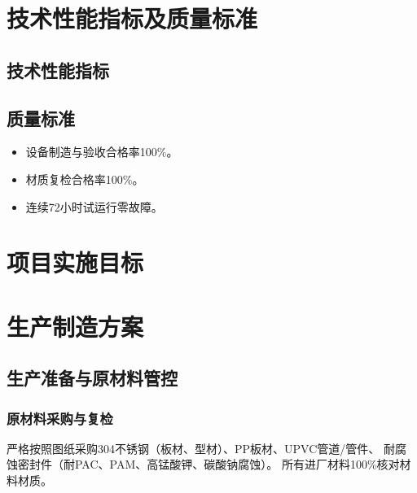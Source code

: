 \documentclass[UTF8,a4paper,12pt,titlepage]{ctexart}
\begin{document}


\tableofcontents %

\newpage %


\section{技术性能指标及质量标准}
    \subsection{技术性能指标}
        
    \subsection{质量标准}
        \begin{itemize}
            \item 设备制造与验收合格率100\%。
            \item 材质复检合格率100\%。
            \item 连续72小时试运行零故障。
        \end{itemize}

\section{项目实施目标}
    

\section{生产制造方案}
    \subsection{生产准备与原材料管控}
        \subsubsection{原材料采购与复检}
        严格按照图纸采购304不锈钢（板材、型材）、PP板材、UPVC管道/管件、
        耐腐蚀密封件（耐PAC、PAM、高锰酸钾、碳酸钠腐蚀）。
        所有进厂材料100\%核对材料材质。
\end{document}
